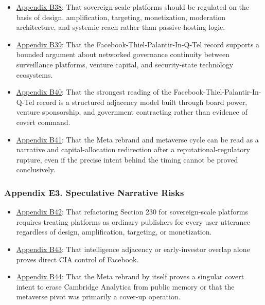 \documentclass[
  american,
  11pt,
  letterpaper,
]{article}
\providecommand{\tightlist}{%
  \setlength{\itemsep}{0pt}\setlength{\parskip}{0pt}}
\begin{document}
\begin{itemize}
\tightlist
\item
  \hyperref[appendix-b38-sovereign-scale-platforms-should-be-regulated-on-the-basis-of-design-amplificati]{Appendix
  B38}: That sovereign-scale platforms should be regulated on the basis
  of design, amplification, targeting, monetization, moderation
  architecture, and systemic reach rather than passive-hosting logic.
\item
  \hyperref[appendix-b39-the-facebook-thiel-palantir-in-q-tel-record-supports-a-bounded-argument-about-net]{Appendix
  B39}: That the Facebook-Thiel-Palantir-In-Q-Tel record supports a
  bounded argument about networked governance continuity between
  surveillance platforms, venture capital, and security-state technology
  ecosystems.
\item
  \hyperref[appendix-b40-the-strongest-reading-of-the-facebook-thiel-palantir-in-q-tel-record-is-a-structu]{Appendix
  B40}: That the strongest reading of the
  Facebook-Thiel-Palantir-In-Q-Tel record is a structured adjacency
  model built through board power, venture sponsorship, and government
  contracting rather than evidence of covert command.
\item
  \hyperref[appendix-b41-the-meta-rebrand-and-metaverse-cycle-can-be-read-as-a-narrative-and-capital-alloc]{Appendix
  B41}: That the Meta rebrand and metaverse cycle can be read as a
  narrative and capital-allocation redirection after a
  reputational-regulatory rupture, even if the precise intent behind the
  timing cannot be proved conclusively.
\end{itemize}

\subsubsection{Appendix E3. Speculative Narrative
Risks}\label{appendix-e3-speculative-narrative-risks}

\begin{itemize}
\tightlist
\item
  \hyperref[appendix-b42-refactoring-section-230-for-sovereign-scale-platforms-requires-treating-platforms]{Appendix
  B42}: That refactoring Section 230 for sovereign-scale platforms
  requires treating platforms as ordinary publishers for every user
  utterance regardless of design, amplification, targeting, or
  monetization.
\item
  \hyperref[appendix-b43-intelligence-adjacency-or-early-investor-overlap-alone-proves-direct-cia-control]{Appendix
  B43}: That intelligence adjacency or early-investor overlap alone
  proves direct CIA control of Facebook.
\item
  \hyperref[appendix-b44-the-meta-rebrand-by-itself-proves-a-singular-covert-intent-to-erase-cambridge-ana]{Appendix
  B44}: That the Meta rebrand by itself proves a singular covert intent
  to erase Cambridge Analytica from public memory or that the metaverse
  pivot was primarily a cover-up operation.
\end{itemize}
\end{document}
